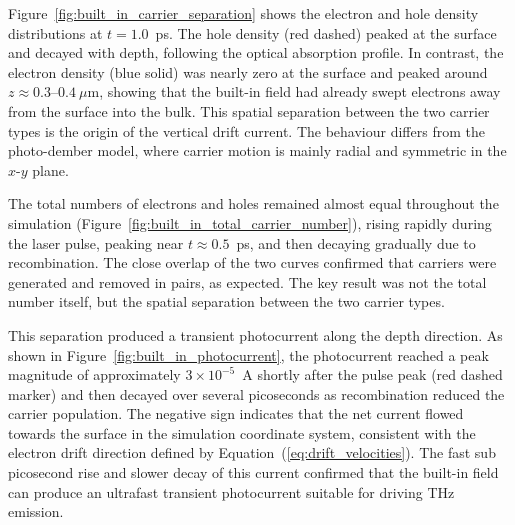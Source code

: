 \documentclass[12pt]{final_project_report}
\begin{document}
Figure~\ref{fig:built_in_carrier_separation} shows the electron and hole density distributions at $t = 1.0$~ps. The hole density (red dashed) peaked at the surface and decayed with depth, following the optical absorption profile. In contrast, the electron density (blue solid) was nearly zero at the surface and peaked around $z \approx 0.3$--$0.4~\mu\mathrm{m}$, showing that the built-in field had already swept electrons away from the surface into the bulk. This spatial separation between the two carrier types is the origin of the vertical drift current. The behaviour differs from the photo-dember model, where carrier motion is mainly radial and symmetric in the $x$-$y$ plane.

The total numbers of electrons and holes remained almost equal throughout the simulation (Figure~\ref{fig:built_in_total_carrier_number}), rising rapidly during the laser pulse, peaking near $t \approx 0.5$~ps, and then decaying gradually due to recombination. The close overlap of the two curves confirmed that carriers were generated and removed in pairs, as expected. The key result was not the total number itself, but the spatial separation between the two carrier types.

This separation produced a transient photocurrent along the depth direction. As shown in Figure~\ref{fig:built_in_photocurrent}, the photocurrent reached a peak magnitude of approximately $3 \times 10^{-5}$~A shortly after the pulse peak (red dashed marker) and then decayed over several picoseconds as recombination reduced the carrier population. The negative sign indicates that the net current flowed towards the surface in the simulation coordinate system, consistent with the electron drift direction defined by Equation~(\ref{eq:drift_velocities}). The fast sub picosecond rise and slower decay of this current confirmed that the built-in field can produce an ultrafast transient photocurrent suitable for driving THz emission.
\end{document}
